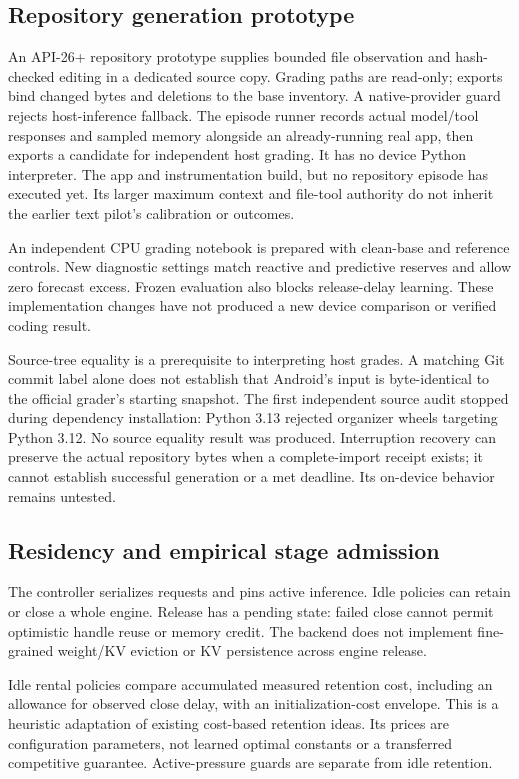 \documentclass[10pt,twocolumn]{article}
\begin{document}
\subsection{Repository generation prototype}
An API-26+ repository prototype supplies bounded file observation and hash-checked
editing in a dedicated source copy. Grading paths are read-only; exports bind
changed bytes and deletions to the base inventory. A native-provider guard
rejects host-inference fallback. The episode runner records actual model/tool
responses and sampled memory alongside an already-running real app, then exports
a candidate for independent host grading. It has no device Python interpreter.
The app and instrumentation build, but no repository episode has executed yet.
Its larger maximum context and file-tool authority do not inherit the earlier
text pilot's calibration or outcomes.

An independent CPU grading notebook is prepared with clean-base and reference
controls. New diagnostic settings match reactive and predictive reserves and
allow zero forecast excess. Frozen evaluation also blocks release-delay
learning. These implementation changes have not produced a new device
comparison or verified coding result.

Source-tree equality is a prerequisite to interpreting host grades. A matching
Git commit label alone does not establish that Android's input is byte-identical
to the official grader's starting snapshot. The first independent source audit
stopped during dependency installation: Python 3.13 rejected organizer wheels
targeting Python 3.12. No source equality result was produced. Interruption
recovery can preserve the actual repository bytes when a complete-import receipt
exists; it cannot establish successful generation or a met deadline. Its
on-device behavior remains untested.

\subsection{Residency and empirical stage admission}

The controller serializes requests and pins active inference. Idle policies can
retain or close a whole engine. Release has a pending state: failed close cannot
permit optimistic handle reuse or memory credit. The backend does not implement
fine-grained weight/KV eviction or KV persistence across engine release.

Idle rental policies compare accumulated measured retention cost, including an
allowance for observed close delay, with an initialization-cost envelope. This
is a heuristic adaptation of existing cost-based retention ideas. Its prices are
configuration parameters, not learned optimal constants or a transferred
competitive guarantee. Active-pressure guards are separate from idle retention.
\end{document}

